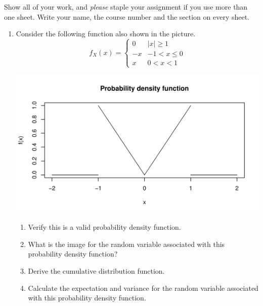 


\renewcommand{\ansfont}[1]{}



\pagestyle{fancy} 
Show all of your work, and \emph{please} staple your assignment if you use more than one sheet. Write your name, the course number and the section on every sheet. 

\begin{enumerate} 
 
 
\item Consider the following function also shown in the picture.
\[ f_X(x) = \left\{ \begin{array}{cc} 
0 & |x| \ge 1 \\
-x & -1 < x \le 0 \\
x & 0< x < 1
\end{array} \right. \]

\begin{center}
\includegraphics[scale=0.5]{plot}
\end{center}

\begin{enumerate}
\item Verify this is a valid probability density function.
\item What is the image for the random variable associated with this probability density function?
\item Derive the cumulative distribution function.
\item Calculate the expectation and variance for the random variable associated with this probability density function.
\end{enumerate}


\end{enumerate}
